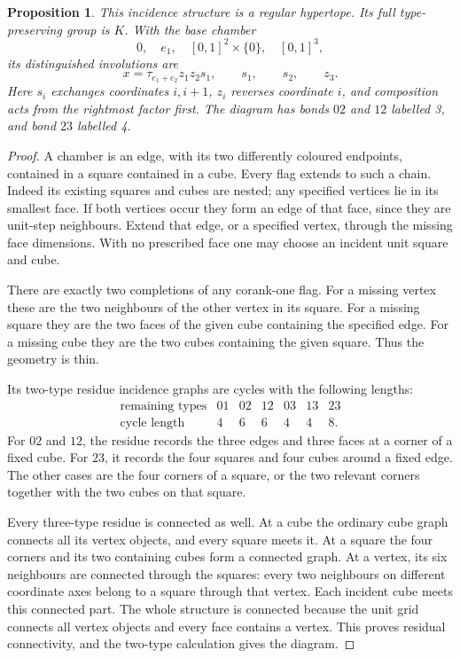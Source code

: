 \documentclass[11pt]{article}
\newtheorem{proposition}{Proposition}
\begin{document}
\begin{proposition}
This incidence structure is a regular hypertope. Its full
type-preserving group is $K$. With the base chamber
\[
 0,\quad e_1,\quad [0,1]^2\times\{0\},\quad [0,1]^3,
\]
its distinguished involutions are
\[
 x=\tau_{e_1+e_2}z_1z_2s_1,\qquad s_1,\qquad s_2,\qquad z_3.
\]
Here $s_i$ exchanges coordinates $i,i+1$, $z_i$ reverses coordinate
$i$, and composition acts from the rightmost factor first. The diagram
has bonds $02$ and $12$ labelled 3, and bond $23$ labelled 4.
\end{proposition}
\begin{proof}
A chamber is an edge, with its two differently coloured endpoints,
contained in a square contained in a cube. Every flag extends to such
a chain. Indeed its existing squares and cubes are nested; any specified
vertices lie in its smallest face. If both vertices occur they form
an edge of that face, since they are unit-step neighbours. Extend that
edge, or a specified vertex, through the missing face dimensions.
With no prescribed face one may choose an incident unit square and cube.

There are exactly two completions of any corank-one flag. For a missing
vertex these are the two neighbours of the other vertex in its square.
For a missing square they are the two faces of the given cube containing
the specified edge. For a missing cube they are the two cubes containing
the given square. Thus the geometry is thin.

Its two-type residue incidence graphs are cycles with the following
lengths:
\[
\begin{array}{c|rrrrrr}
\text{remaining types}&01&02&12&03&13&23\\\hline
\text{cycle length}&4&6&6&4&4&8.
\end{array}
\]
For $02$ and $12$, the residue records the three edges and three
faces at a corner of a fixed cube. For $23$, it records the four
squares and four cubes around a fixed edge. The other cases are the
four corners of a square, or the two relevant corners together with
the two cubes on that square.

Every three-type residue is connected as well. At a cube the ordinary
cube graph connects all its vertex objects, and every square meets it.
At a square the four corners and its two containing cubes form a
connected graph. At a vertex, its six neighbours are connected through
the squares: every two neighbours on different coordinate axes belong
to a square through that vertex. Each incident cube meets this connected
part. The whole structure is connected because the unit grid connects
all vertex objects and every face contains a vertex. This proves
residual connectivity, and the two-type calculation gives the diagram.


\end{proof}
\end{document}
